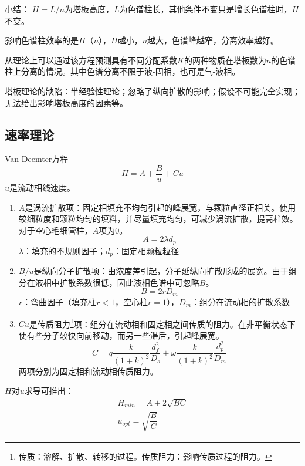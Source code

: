 小结：
$H=L/n$为塔板高度，$L$为色谱柱长，其他条件不变只是增长色谱柱时，$H$不变。

影响色谱柱效率的是$H$（$n$），$H$越小，$n$越大，色谱峰越窄，分离效率越好。

从理论上可以通过该方程预测具有不同分配系数$K$的两种物质在塔板数为$n$的色谱柱上分离的情况。其中色谱分离不限于液-固相，也可是气-液相。

塔板理论的缺陷：半经验性理论；忽略了纵向扩散的影响；假设不可能完全实现；无法给出影响塔板高度的因素等。

\subsection{速率理论}

\begin{theorem*}{Van Deemter方程}{}
	\begin{equation*}
		H=A+\dfrac{B}{u}+Cu
	\end{equation*}
	$u$是流动相线速度。
\end{theorem*}

\begin{enumerate}
	\item $A$是涡流扩散项：固定相填充不均匀引起的峰展宽，与颗粒直径正相关。使用较细粒度和颗粒均匀的填料，并尽量填充均匀，可减少涡流扩散，提高柱效。对于空心毛细管柱，$A$项为$0$。
	\begin{equation*}
		A=2\lambda d_p
	\end{equation*}
	$\lambda$：填充的不规则因子；$d_p$：固定相颗粒粒径
	\item $B/u$是纵向分子扩散项：由浓度差引起，分子延纵向扩散形成的展宽。由于组分在液相中扩散系数很低，因此液相色谱中可忽略$B$。
	\begin{equation*}
		B=2rD_m
	\end{equation*}
	$r$：弯曲因子（填充柱$r<1$，空心柱$r=1$），$D_m$：组分在流动相的扩散系数
	\item $Cu$是传质阻力\footnote{传质：溶解、扩散、转移的过程。传质阻力：影响传质过程的阻力。}项：组分在流动相和固定相之间传质的阻力。在非平衡状态下使有些分子较快向前移动，而另一些滞后，引起峰展宽。
	\begin{equation*}
		C=q\dfrac{k}{(1+k)^2}\dfrac{d_f^2}{D_s}+\omega\dfrac{k}{(1+k)^2}\dfrac{d_p^2}{D_m}
	\end{equation*}
	两项分别为固定相和流动相传质阻力。
\end{enumerate}

$H$对$u$求导可推出：
\begin{gather*}
	H_{min}=A+2\sqrt{BC}\\
	u_{opt}=\sqrt{\dfrac{B}{C}}
\end{gather*}

